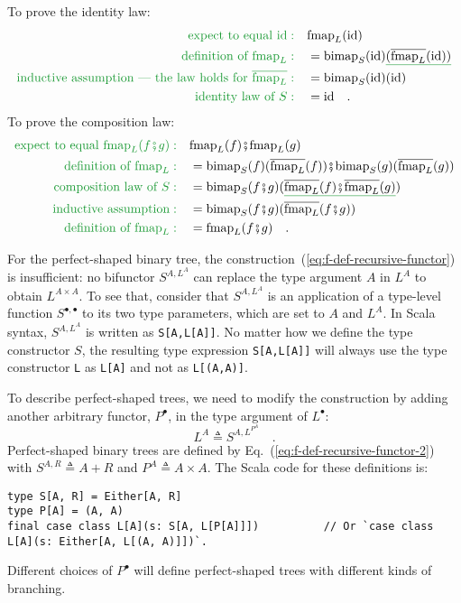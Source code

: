 To prove the identity law:
\begin{align*}
{\color{greenunder}\text{expect to equal }\text{id}:}\quad & \text{fmap}_{L}(\text{id})\\
{\color{greenunder}\text{definition of }\text{fmap}_{L}:}\quad & =\text{bimap}_{S}(\text{id})\gunderline{(\overline{\text{fmap}_{L}}(\text{id}))}\\
{\color{greenunder}\text{inductive assumption --- the law holds for }\overline{\text{fmap}_{L}}:}\quad & =\text{bimap}_{S}(\text{id})(\text{id})\\
{\color{greenunder}\text{identity law of }S:}\quad & =\text{id}\quad.
\end{align*}
To prove the composition law:
\begin{align*}
{\color{greenunder}\text{expect to equal }\text{fmap}_{L}(f\bef g):}\quad & \text{fmap}_{L}(f)\bef\text{fmap}_{L}(g)\\
{\color{greenunder}\text{definition of }\text{fmap}_{L}:}\quad & =\text{bimap}_{S}(f)(\overline{\text{fmap}_{L}}(f))\bef\text{bimap}_{S}(g)(\overline{\text{fmap}_{L}}(g))\\
{\color{greenunder}\text{composition law of }S:}\quad & =\text{bimap}_{S}(f\bef g)(\gunderline{\overline{\text{fmap}_{L}}(f)\bef\overline{\text{fmap}_{L}}(g)})\\
{\color{greenunder}\text{inductive assumption}:}\quad & =\text{bimap}_{S}(f\bef g)(\overline{\text{fmap}_{L}}(f\bef g))\\
{\color{greenunder}\text{definition of }\text{fmap}_{L}:}\quad & =\text{fmap}_{L}(f\bef g)\quad.
\end{align*}

For the perfect-shaped binary tree, the construction~(\ref{eq:f-def-recursive-functor})
is insufficient: no bifunctor $S^{A,L^{A}}$ can replace the type
argument $A$ in $L^{A}$ to obtain $L^{A\times A}$. To see that,
consider that $S^{A,L^{A}}$ is an application of a type-level function
$S^{\bullet,\bullet}$ to its two type parameters, which are set to
$A$ and $L^{A}$. In Scala syntax, $S^{A,L^{A}}$ is written as \lstinline!S[A,L[A]]!.
No matter how we define the type constructor $S$, the resulting type
expression \lstinline!S[A,L[A]]! will always use the type constructor
\lstinline!L! as \lstinline!L[A]! and not as \lstinline!L[(A,A)]!. 

To describe perfect-shaped trees, we need to modify the construction
by adding another arbitrary functor, $P^{\bullet}$, in the type argument
of $L^{\bullet}$:
\begin{equation}
L^{A}\triangleq S^{A,L^{P^{A}}}\quad.\label{eq:f-def-recursive-functor-2}
\end{equation}
Perfect-shaped binary trees are defined by Eq.~(\ref{eq:f-def-recursive-functor-2})
with $S^{A,R}\triangleq A+R$ and $P^{A}\triangleq A\times A$. The
Scala code for these definitions is:
\begin{lstlisting}
type S[A, R] = Either[A, R]
type P[A] = (A, A)
final case class L[A](s: S[A, L[P[A]]])          // Or `case class L[A](s: Either[A, L[(A, A)]])`.
\end{lstlisting}
Different choices of $P^{\bullet}$ will define perfect-shaped trees
with different kinds of branching.


